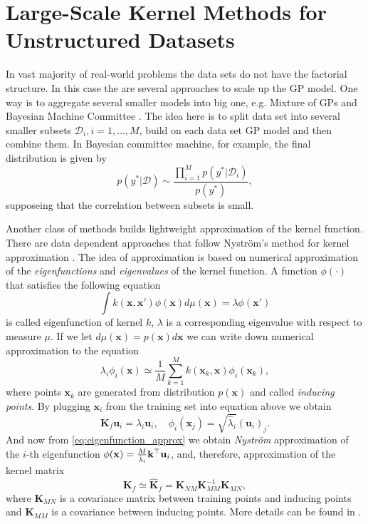 \chapter{Large-Scale Kernel Methods for Unstructured Datasets}
\label{chap:unstructured_datasets}
In vast majority of real-world problems the data sets do not have the factorial structure.
In this case the are several approaches to scale up the GP model.
One way is to aggregate several smaller models into big one,
e.g. Mixture of GPs and Bayesian Machine Committee
\citep{rasmussen2006gaussian, rasmussen2001infinite}.
The idea here is to split data set into several smaller subsets
$\mathcal{D}_i, i=1, \ldots, M$, build on each data set GP model and then combine them.
In Bayesian committee machine, for example, the final distribution is given by
\[
    p(y^* | \mathcal{D}) \sim \frac{\prod_{i=1}^M p(y^* | \mathcal{D}_i)}{p(y^*)},
\]
supposeing that the correlation between subsets is small.

Another class of methods builds lightweight approximation of the kernel function.
There are data dependent approaches that follow Nystr{\"o}m's method for kernel approximation
\citep{rasmussen2006gaussian}.
The idea of approximation is based on numerical approximation of the {\em eigenfunctions}
and {\em eigenvalues} of the kernel function.
A function $\phi(\cdot)$ that satisfies the following equation
\[
    \int k(\mathbf{x, x}')\phi(\mathbf{x}) d\mu(\mathbf{x}) = \lambda \phi(\mathbf{x}')
\]
is called eigenfunction of kernel $k$, $\lambda$ is a corresponding eigenvalue
with respect to measure $\mu$.
If we let $d\mu(\mathbf{x}) = p(\mathbf{x})d\mathbf{x}$ we can write down
numerical approximation to the equation
\begin{equation}
\label{eq:eigenfunction_approx}
    \lambda_i \phi_i(\mathbf{x}) \simeq
    \frac{1}{M} \sum_{k=1}^M k(\mathbf{x}_k, \mathbf{x}) \phi_i(\mathbf{x}_k),
\end{equation}
where points $\mathbf{x}_k$ are generated from distribution $p(\mathbf{x})$
and called {\em inducing points}.
By plugging $\mathbf{x}_i$ from the training set into equation above we obtain
\[
    \mathbf{K}_f \mathbf{u}_i = \hat{\lambda}_i \mathbf{u}_i,
    \quad
    \phi_i(\mathbf{x}_j) = \sqrt{\hat{\lambda}_i} \left ( \mathbf{u}_i \right )_j.
\]
And now from \eqref{eq:eigenfunction_approx} we obtain {\em Nystr{\"o}m} approximation
of the $i$-th eigenfunction $\phi(\mathbf{x}) = \frac{M}{\hat{\lambda}_i}\mathbf{k}^\top \mathbf{u}_i$, and, therefore, approximation of the kernel matrix
\begin{equation}
\label{eq:nystrom_matrix}
    \mathbf{K}_f \simeq \widehat{\mathbf{K}}_f = \mathbf{K}_{NM}\mathbf{K}_{MM}^{-1}\mathbf{K}_{MN},
\end{equation}
where $\mathbf{K}_{MN}$ is a covariance matrix between training points and inducing points
and $\mathbf{K}_{MM}$ is a covariance between inducing points.
More details can be found in \citep{rasmussen2006gaussian}.

